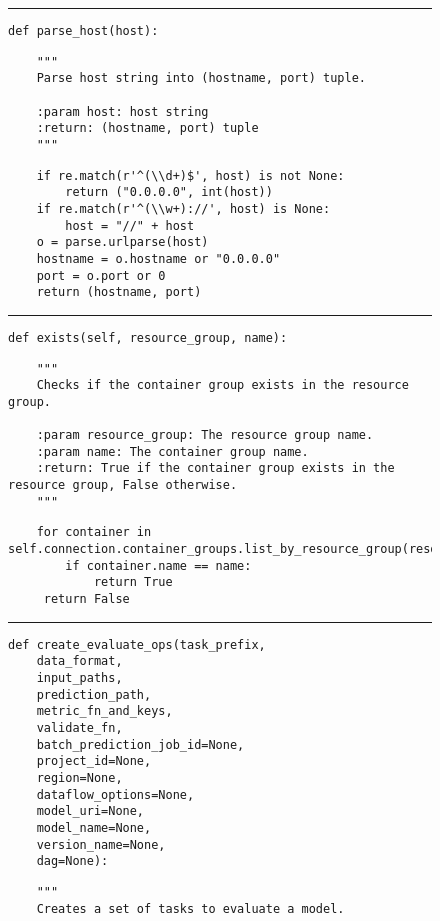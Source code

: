 \documentclass[10pt]{article}
\begin{document}
{


\begin{figure}
\noindent\rule{\textwidth}{1pt}
\begin{verbatim}
def parse_host(host):
\end{verbatim}
\vspace{-0.5cm}
\begin{verbatim}
    """
    Parse host string into (hostname, port) tuple.
    
    :param host: host string
    :return: (hostname, port) tuple
    """
\end{verbatim}
\vspace{-0.8cm}
\begin{verbatim}
    if re.match(r'^(\\d+)$', host) is not None:
        return ("0.0.0.0", int(host))
    if re.match(r'^(\\w+)://', host) is None:
        host = "//" + host    
    o = parse.urlparse(host)
    hostname = o.hostname or "0.0.0.0"
    port = o.port or 0
    return (hostname, port)
\end{verbatim}
\vspace{-0.5cm}
\noindent\rule{\textwidth}{1pt}
\begin{verbatim}
def exists(self, resource_group, name):
\end{verbatim}
\vspace{-0.5cm}
\begin{verbatim}
    """
    Checks if the container group exists in the resource group.
    
    :param resource_group: The resource group name.
    :param name: The container group name.
    :return: True if the container group exists in the resource group, False otherwise.    
    """
\end{verbatim}
\vspace{-0.8cm}
\begin{verbatim}
    for container in self.connection.container_groups.list_by_resource_group(resource_group):
        if container.name == name:
            return True       
     return False
\end{verbatim}
\vspace{-0.5cm}
\noindent\rule{\textwidth}{1pt}
\begin{verbatim}
def create_evaluate_ops(task_prefix,
    data_format,
    input_paths,
    prediction_path,
    metric_fn_and_keys,
    validate_fn,
    batch_prediction_job_id=None,
    project_id=None,
    region=None,
    dataflow_options=None,
    model_uri=None,
    model_name=None,
    version_name=None,
    dag=None):
\end{verbatim}
\vspace{-0.5cm}
\begin{verbatim}
    """
    Creates a set of tasks to evaluate a model.
    

\end{verbatim}
\end{figure}}
\end{document}
